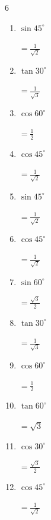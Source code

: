 \begin{multicols}{6}
\begin{enumerate}
        $\displaystyle =\frac{1}{2}$

  \item $\displaystyle \sin{45^\circ}$

        $\displaystyle =\frac{1}{\sqrt{2}}$

  \item $\displaystyle \tan{30^\circ}$

        $\displaystyle =\frac{1}{\sqrt{3}}$

  \item $\displaystyle \cos{60^\circ}$

        $\displaystyle =\frac{1}{2}$

  \item $\displaystyle \cos{45^\circ}$

        $\displaystyle =\frac{1}{\sqrt{2}}$

  \item $\displaystyle \sin{45^\circ}$

        $\displaystyle =\frac{1}{\sqrt{2}}$

  \item $\displaystyle \cos{45^\circ}$

        $\displaystyle =\frac{1}{\sqrt{2}}$

\columnbreak %

\resetques

  \item $\displaystyle \sin{60^\circ}$

        $\displaystyle =\frac{\sqrt{3}}{2}$

  \item $\displaystyle \tan{30^\circ}$

        $\displaystyle =\frac{1}{\sqrt{3}}$

  \item $\displaystyle \cos{60^\circ}$

        $\displaystyle =\frac{1}{2}$

  \item $\displaystyle \tan{60^\circ}$

        $\displaystyle =\sqrt{3}$

  \item $\displaystyle \cos{30^\circ}$

        $\displaystyle =\frac{\sqrt{3}}{2}$

  \item $\displaystyle \cos{45^\circ}$

        $\displaystyle =\frac{1}{\sqrt{2}}$


\end{enumerate}
\end{multicols}
